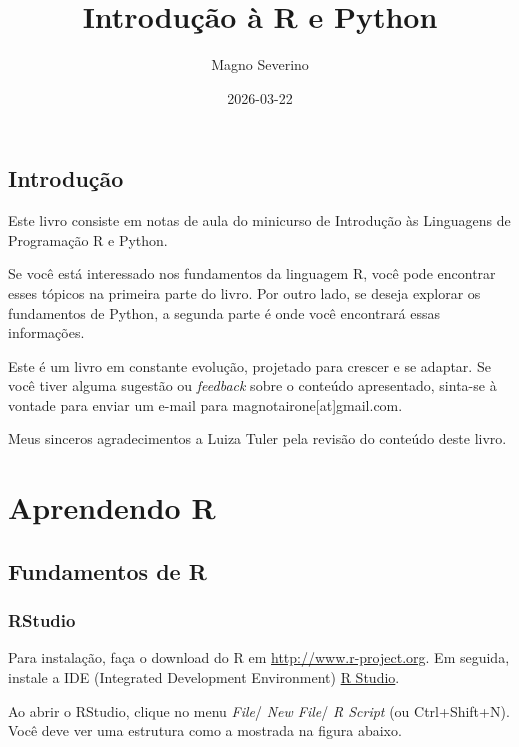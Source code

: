 \documentclass[
  portuguese,
  letterpaper,
  DIV=11,
  numbers=noendperiod]{scrreprt}
\title{Introdução à R e Python}
\author{Magno Severino}
\date{2026-03-22}
\renewcommand*\contentsname{Índice}
\newcommand\contentsname{Índice}
\theoremstyle{definition}
\theoremstyle{remark}
\begin{document}
\maketitle

\renewcommand*\contentsname{Índice}
{
\hypersetup{linkcolor=}
\setcounter{tocdepth}{2}
\tableofcontents
}


\chapter*{Introdução}\label{introduuxe7uxe3o}


Este livro consiste em notas de aula do minicurso de Introdução às
Linguagens de Programação R e Python.

Se você está interessado nos fundamentos da linguagem R, você pode
encontrar esses tópicos na primeira parte do livro. Por outro lado, se
deseja explorar os fundamentos de Python, a segunda parte é onde você
encontrará essas informações.

Este é um livro em constante evolução, projetado para crescer e se
adaptar. Se você tiver alguma sugestão ou \emph{feedback} sobre o
conteúdo apresentado, sinta-se à vontade para enviar um e-mail para
magnotairone{[}at{]}gmail.com.

Meus sinceros agradecimentos a Luiza Tuler pela revisão do conteúdo
deste livro.

\part{Aprendendo R}

\chapter{Fundamentos de R}\label{sec-cap-fundamentos}

\section{RStudio}\label{rstudio}

Para instalação, faça o download do R em \url{http://www.r-project.org}.
Em seguida, instale a IDE (Integrated Development Environment)
\href{http://www.rstudio.org}{R Studio}.

Ao abrir o RStudio, clique no menu \emph{File}/ \emph{New File}/ \emph{R
Script} (ou Ctrl+Shift+N). Você deve ver uma estrutura como a mostrada
na figura abaixo.
\end{document}
